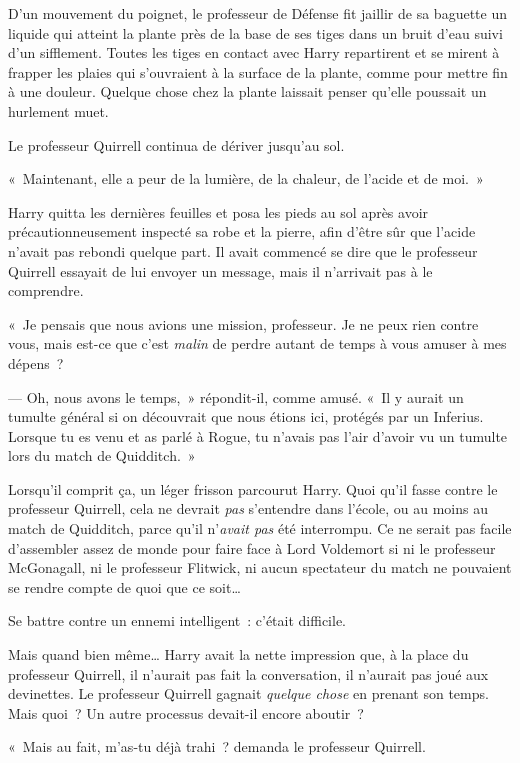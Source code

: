 D'un mouvement du poignet, le professeur de Défense fit jaillir de sa baguette un liquide qui atteint la plante près de la base de ses tiges dans un bruit d'eau suivi d'un sifflement. Toutes les tiges en contact avec Harry repartirent et se mirent à frapper les plaies qui s'ouvraient à la surface de la plante, comme pour mettre fin à une douleur. Quelque chose chez la plante laissait penser qu'elle poussait un hurlement muet.

Le professeur Quirrell continua de dériver jusqu'au sol.

«~Maintenant, elle a peur de la lumière, de la chaleur, de l'acide et de moi.~»

Harry quitta les dernières feuilles et posa les pieds au sol après avoir précautionneusement inspecté sa robe et la pierre, afin d'être sûr que l'acide n'avait pas rebondi quelque part. Il avait commencé se dire que le professeur Quirrell essayait de lui envoyer un message, mais il n'arrivait pas à le comprendre.

«~Je pensais que nous avions une mission, professeur. Je ne peux rien contre vous, mais est-ce que c'est \emph{malin} de perdre autant de temps à vous amuser à mes dépens~?

--- Oh, nous avons le temps,~» répondit-il, comme amusé. «~Il y aurait un tumulte général si on découvrait que nous étions ici, protégés par un Inferius. Lorsque tu es venu et as parlé à Rogue, tu n'avais pas l'air d'avoir vu un tumulte lors du match de Quidditch.~»

Lorsqu'il comprit ça, un léger frisson parcourut Harry. Quoi qu'il fasse contre le professeur Quirrell, cela ne devrait \emph{pas} s'entendre dans l'école, ou au moins au match de Quidditch, parce qu'il n'\emph{avait pas} été interrompu. Ce ne serait pas facile d'assembler assez de monde pour faire face à Lord Voldemort si ni le professeur McGonagall, ni le professeur Flitwick, ni aucun spectateur du match ne pouvaient se rendre compte de quoi que ce soit…

Se battre contre un ennemi intelligent~: c'était difficile.

Mais quand bien même… Harry avait la nette impression que, à la place du professeur Quirrell, il n'aurait pas fait la conversation, il n'aurait pas joué aux devinettes. Le professeur Quirrell gagnait \emph{quelque chose} en prenant son temps. Mais quoi~? Un autre processus devait-il encore aboutir~?

«~Mais au fait, m'as-tu déjà trahi~? demanda le professeur Quirrell.

